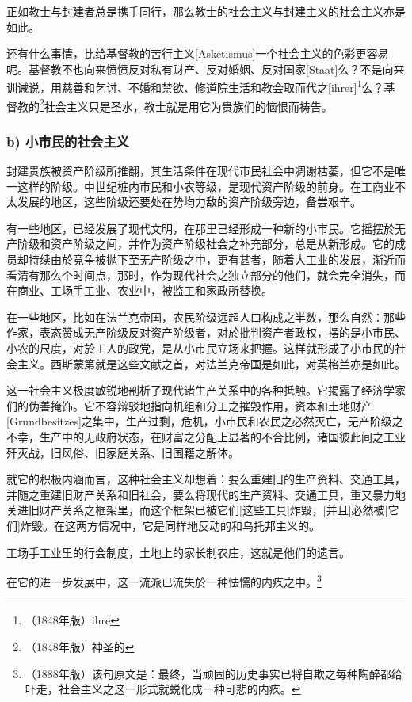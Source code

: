 \documentclass[a4paper,12pt]{ctexart}
\begin{document}
正如教士与封建者总是携手同行，那么教士的社会主义与封建主义的社会主义亦是如此。

还有什么事情，比给基督教的苦行主义[Asketismus]一个社会主义的色彩更容易呢。基督教不也向来愤愤反对私有财产、反对婚姻、反对国家[Staat]么？不是向来训诫说，用慈善和乞讨、不婚和禁欲、修道院生活和教会取而代之[ihrer]\footnote{（1848年版）ihre}么？基督教的\footnote{（1848年版）神圣的}社会主义只是圣水，教士就是用它为贵族们的恼恨而祷告。

\subsubsection{b) 小市民的社会主义}

封建贵族被资产阶级所推翻，其生活条件在现代市民社会中凋谢枯萎，但它不是唯一这样的阶级。中世纪桩内市民和小农等级，是现代资产阶级的前身。在工商业不太发展的地区，这些阶级还要处在势均力敌的资产阶级旁边，备尝艰辛。

有一些地区，已经发展了现代文明，在那里已经形成一种新的小市民。它摇摆於无产阶级和资产阶级之间，并作为资产阶级社会之补充部分，总是从新形成。它的成员却持续由於竞争被抛下至无产阶级之中，更有甚者，随着大工业的发展，渐近而看清有那么个时间点，那时，作为现代社会之独立部分的他们，就会完全消失，而在商业、工场手工业、农业中，被监工和家政所替换。

在一些地区，比如在法兰克帝国，农民阶级远超人口构成之半数，那么自然：那些作家，表态赞成无产阶级反对资产阶级者，对於批判资产者政权，摆的是小市民、小农的尺度，对於工人的政党，是从小市民立场来把握。这样就形成了小市民的社会主义。西斯蒙第就是这些文献之首，对法兰克帝国是如此，对英格兰亦是如此。

这一社会主义极度敏锐地剖析了现代诸生产关系中的各种抵触。它揭露了经济学家们的伪善掩饰。它不容辩驳地指向机组和分工之摧毁作用，资本和土地财产[Grundbesitzes]之集中，生产过剩，危机，小市民和农民之必然灭亡，无产阶级之不幸，生产中的无政府状态，在财富之分配上显著的不合比例，诸国彼此间之工业歼灭战，旧风俗、旧家庭关系、旧国籍之解体。

就它的积极内涵而言，这种社会主义却想着：要么重建旧的生产资料、交通工具，并随之重建旧财产关系和旧社会，要么将现代的生产资料、交通工具，重又暴力地关进旧财产关系之框架里，而这个框架已被它们[这些工具]炸毁，[并且]必然被[它们]炸毁。在这两方情况中，它是同样地反动的和乌托邦主义的。

工场手工业里的行会制度，土地上的家长制农庄，这就是他们的遗言。

在它的进一步发展中，这一流派已流失於一种怯懦的内疚之中。\footnote{（1888年版）该句原文是：最终，当顽固的历史事实已将自欺之每种陶醉都给吓走，社会主义之这一形式就蜕化成一种可悲的内疚。}
\end{document}
